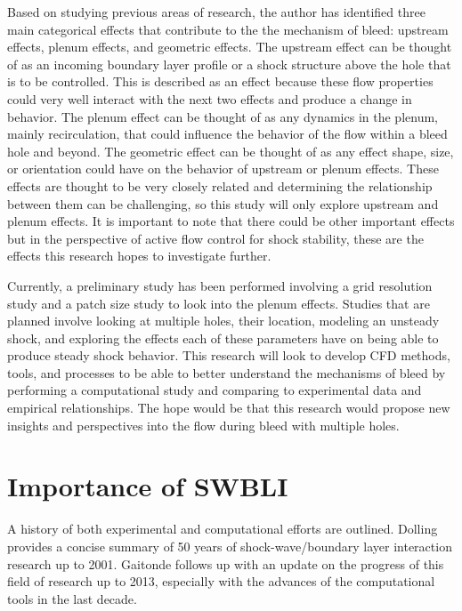 Based on studying previous areas of research\cite{Oorebeek2012}, the author has identified three main categorical effects that contribute to the the mechanism of bleed: upstream effects, plenum effects, and geometric effects. The upstream effect can be thought of as an incoming boundary layer profile or a shock structure above the hole that is to be controlled. This is described as an effect because these flow properties could very well interact with the next two effects and produce a change in behavior. The plenum effect can be thought of as any dynamics in the plenum, mainly recirculation, that could influence the behavior of the flow within a bleed hole and beyond. The geometric effect can be thought of as any effect shape, size, or orientation could have on the behavior of upstream or plenum effects. These effects are thought to be very closely related and determining the relationship between them can be challenging, so this study will only explore upstream and plenum effects. It is important to note that there could be other important effects but in the perspective of active flow control for shock stability, these are the effects this research hopes to investigate further.

Currently, a preliminary study has been performed involving a grid resolution study and a patch size study to look into the plenum effects. Studies that are planned involve looking at multiple holes, their location, modeling an unsteady shock, and exploring the effects each of these parameters have on being able to produce steady shock behavior. This research will look to develop CFD methods, tools, and processes to be able to better understand the mechanisms of bleed by performing a computational study and comparing to experimental data and empirical relationships\cite{Slater2009}. The hope would be that this research would propose new insights and perspectives into the flow during bleed with multiple holes.

\section{Importance of SWBLI}

A history of both experimental and computational efforts are outlined. Dolling \cite{Dolling2001} provides a concise summary of 50 years of shock-wave/boundary layer interaction research up to 2001. Gaitonde \cite{Gaitonde2013} follows up with an update on the progress of this field of research up to 2013, especially with the advances of the computational tools in the last decade.

